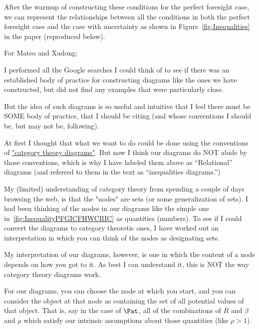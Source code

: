 \documentclass[\econtexRoot/BufferStockTheory]{subfiles}
\begin{document}
After the warmup of constructing these conditions for the perfect foresight case, we can represent the relationships between all the conditions in both the perfect foresight case and the case with uncertainty as shown in Figure~\ref{fig:Inequalities} in the paper (reproduced below).

\renewcommand{\figName}{Inequalities} %
\renewcommand{\figFile}{\figName} %
\hypertarget{\figFile}{}
\hypertarget{\figName}{}

\begin{CDCPrivate}
  \pagebreak


  For Mateo and Xudong:
  
  I performed all the Google searches I could think of to see if there was an established body of practice for constructing diagrams like the ones we have constructed, but did not find any examples that were particularly close.  

  But the idea of such diagrams is so useful and intuitive that I feel there must be SOME body of practice, that I should be citing (and whose conventions I should be, but may not be, following).

  At first I thought that what we want to do could be done using the conventions of \href{https://mathematica.stackexchange.com/questions/8654/creating-diagrams-for-category-theory}{"category theory diagrams"}. But now I think our diagrams do NOT abide by those conventions, which is why I have labeled them above as ``Relational'' diagrams (and referred to them in the text as ``inequalities diagrams.'')

  My (limited) understanding of category theory from spending a couple of days browsing the web, is that the "nodes" are sets (or some generalization of sets). I had been thinking of the nodes in our diagrams like the simple one in~\ref{fig:InequalityPFGICFHWCRIC} as quantities (numbers).  To see if I could convert the diagrams to category theoretic ones, I have worked out an interpretation in which you can think of the nodes as designating sets.

  My interpretation of our diagrams, however, is one in which the content of a node depends on how you got to it. As best I can understand it, this is NOT the way category theory diagrams work.

  For our diagrams, you can choose the node at which you start, and you can consider the object at that node as containing the set of all potential values of that object. That is, say in the case of $\Pat$, all of the combinations of ${R}$ and ${\beta}$ and ${\rho}$ which satisfy our intrinsic assumptions about those quantities (like ${\rho} > 1$).


\end{CDCPrivate}
\end{document}
